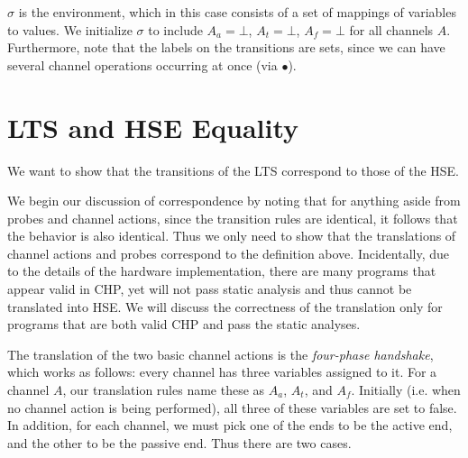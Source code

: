 \documentclass[times, 10pt]{article}
\begin{document}
$\sigma$ is the environment, which in this case consists of a set of mappings of
variables to values.  We initialize $\sigma$ to include $A_a = \bot$, $A_t =
\bot$, $A_f = \bot$ for all channels $A$.  Furthermore, note that the labels on
the transitions are sets, since we can have several channel operations occurring
at once (via $\bullet$).

\section{LTS and HSE Equality}

We want to show that the transitions of the LTS correspond to those of the HSE.

We begin our discussion of correspondence by noting that for anything aside from
probes and channel actions, since the transition rules are identical, it follows
that the behavior is also identical. Thus we only need to show that the
translations of channel actions and probes correspond to the definition above.
Incidentally, due to the details of the hardware implementation, there are many
programs that appear valid in CHP, yet will not pass static analysis and thus
cannot be translated into HSE. We will discuss the correctness of the
translation only for programs that are both valid CHP and pass the static
analyses.

The translation of the two basic channel actions is the \emph{four-phase
handshake}, which works as follows: every channel has three variables assigned
to it. For a channel $A$, our translation rules name these as $A_a$, $A_t$, and
$A_f$. Initially (i.e. when no channel action is being performed), all three of
these variables are set to false. In addition, for each channel, we must pick
one of the ends to be the active end, and the other to be the passive end. Thus
there are two cases.
\end{document}
